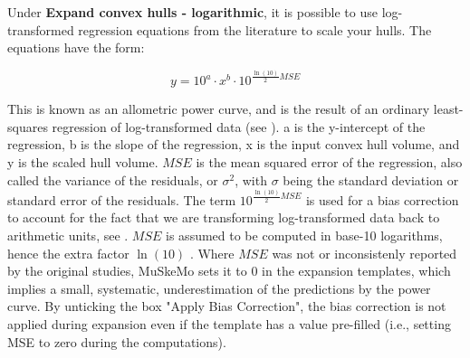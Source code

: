 \documentclass{article}
\begin{document}
Under \textbf{Expand convex hulls - logarithmic}, it is possible to use log-transformed regression equations from the literature to scale your hulls. 
The equations have the form:

\begin{equation}
y = 10^a \cdot x^{b} \cdot 10^{\frac{\ln(10)}{2} MSE }
\label{eq:powercurve}
\end{equation}


This is known as an allometric power curve, and is the result of an ordinary least-squares regression of log-transformed data (see \cite{alexanderPrinciplesAnimalLocomotion2006,brasseyScalingConvexHull2014}). a is the y-intercept of the regression, b is the slope of the regression, x is the input convex hull volume, and y is the scaled hull volume. \(MSE\) is the mean squared error of the regression, also called the variance of the residuals, or $\sigma^2$, with $\sigma$ being the standard deviation or standard error of the residuals. The term $10^{\frac{\ln(10)}{2} MSE }$ is used for a bias correction to account for the fact that we are transforming log-transformed data back to arithmetic units, see \cite{baskervilleUseLogarithmicRegression1972,sprugelCorrectingBiasLogTransformed1983,smithLogarithmicTransformationBias1993}. $MSE$ is assumed to be computed in base-10 logarithms, hence the extra factor $\ln(10)$ \cite{sprugelCorrectingBiasLogTransformed1983,smithLogarithmicTransformationBias1993}. Where $MSE$ was not or inconsistenly reported by the original studies, MuSkeMo sets it to 0 in the expansion templates, which implies a small, systematic, underestimation of the predictions by the power curve. By unticking the box "Apply Bias Correction", the bias correction is not applied during expansion even if the template has a value pre-filled (i.e., setting MSE to zero during the computations).
\end{document}
